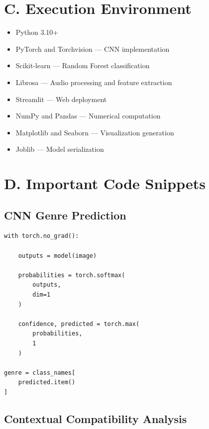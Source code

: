 \documentclass[12pt,a4paper]{report}
\begin{document}
\section*{C. Execution Environment}

\begin{itemize}

\item Python 3.10+

\item PyTorch and Torchvision --- CNN implementation

\item Scikit-learn --- Random Forest classification

\item Librosa --- Audio processing and feature extraction

\item Streamlit --- Web deployment

\item NumPy and Pandas --- Numerical computation

\item Matplotlib and Seaborn --- Visualization generation

\item Joblib --- Model serialization

\end{itemize}

\section*{D. Important Code Snippets}

\subsection*{CNN Genre Prediction}

\begin{lstlisting}
with torch.no_grad():

    outputs = model(image)

    probabilities = torch.softmax(
        outputs,
        dim=1
    )

    confidence, predicted = torch.max(
        probabilities,
        1
    )

genre = class_names[
    predicted.item()
]
\end{lstlisting}

\subsection*{Contextual Compatibility Analysis}
\end{document}
